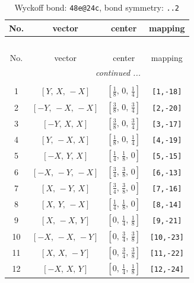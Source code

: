 \documentclass[fleqn,8pt]{jsarticle}
\begin{document}
\begin{longtable}{cccc}
\caption{Wyckoff bond: {\tt 48e@24c}, bond symmetry: {\tt ..2}}
 \\
 \hline \hline
No. & vector & center & mapping \\ \hline \endfirsthead

\multicolumn{3}{l}{\tablename\ \thetable{}} \\
 \hline \hline
No. & vector & center & mapping \\ \hline \endhead

 \hline \hline
\multicolumn{3}{r}{\footnotesize\it continued ...} \\ \endfoot

 \hline \hline
\multicolumn{3}{r}{} \\ \endlastfoot

1 & $\left[ Y,\, X,\, - X \right]$ & $\left[ \frac{1}{8},\, 0,\, \frac{1}{4} \right]$ & {\tt [1,-18]} \\ \hline
2 & $\left[ - Y,\, - X,\, - X \right]$ & $\left[ \frac{3}{8},\, 0,\, \frac{3}{4} \right]$ & {\tt [2,-20]} \\ \hline
3 & $\left[ - Y,\, X,\, X \right]$ & $\left[ \frac{3}{8},\, 0,\, \frac{3}{4} \right]$ & {\tt [3,-17]} \\ \hline
4 & $\left[ Y,\, - X,\, X \right]$ & $\left[ \frac{1}{8},\, 0,\, \frac{1}{4} \right]$ & {\tt [4,-19]} \\ \hline
5 & $\left[ - X,\, Y,\, X \right]$ & $\left[ \frac{1}{4},\, \frac{1}{8},\, 0 \right]$ & {\tt [5,-15]} \\ \hline
6 & $\left[ - X,\, - Y,\, - X \right]$ & $\left[ \frac{3}{4},\, \frac{3}{8},\, 0 \right]$ & {\tt [6,-13]} \\ \hline
7 & $\left[ X,\, - Y,\, X \right]$ & $\left[ \frac{3}{4},\, \frac{3}{8},\, 0 \right]$ & {\tt [7,-16]} \\ \hline
8 & $\left[ X,\, Y,\, - X \right]$ & $\left[ \frac{1}{4},\, \frac{1}{8},\, 0 \right]$ & {\tt [8,-14]} \\ \hline
9 & $\left[ X,\, - X,\, Y \right]$ & $\left[ 0,\, \frac{1}{4},\, \frac{1}{8} \right]$ & {\tt [9,-21]} \\ \hline
10 & $\left[ - X,\, - X,\, - Y \right]$ & $\left[ 0,\, \frac{3}{4},\, \frac{3}{8} \right]$ & {\tt [10,-23]} \\ \hline
11 & $\left[ X,\, X,\, - Y \right]$ & $\left[ 0,\, \frac{3}{4},\, \frac{3}{8} \right]$ & {\tt [11,-22]} \\ \hline
12 & $\left[ - X,\, X,\, Y \right]$ & $\left[ 0,\, \frac{1}{4},\, \frac{1}{8} \right]$ & {\tt [12,-24]} \\ \hline

\end{longtable}
\end{document}
